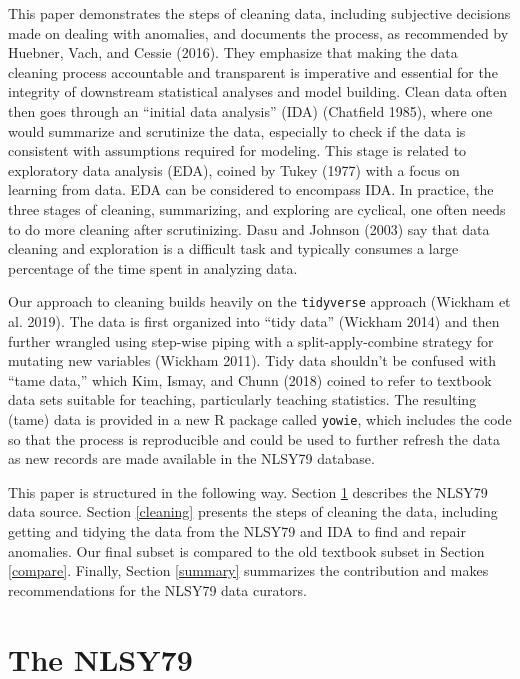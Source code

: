 \documentclass[12pt]{article}
\begin{document}
This paper demonstrates the steps of cleaning data, including subjective decisions made on dealing with anomalies, and documents the process, as recommended by Huebner, Vach, and Cessie (2016). They emphasize that making the data cleaning process accountable and transparent is imperative and essential for the integrity of downstream statistical analyses and model building. Clean data often then goes through an ``initial data analysis'' (IDA) (Chatfield 1985), where one would summarize and scrutinize the data, especially to check if the data is consistent with assumptions required for modeling. This stage is related to exploratory data analysis (EDA), coined by Tukey (1977) with a focus on learning from data. EDA can be considered to encompass IDA. In practice, the three stages of cleaning, summarizing, and exploring are cyclical, one often needs to do more cleaning after scrutinizing. Dasu and Johnson (2003) say that data cleaning and exploration is a difficult task and typically consumes a large percentage of the time spent in analyzing data.

Our approach to cleaning builds heavily on the \texttt{tidyverse} approach (Wickham et al. 2019). The data is first organized into ``tidy data'' (Wickham 2014) and then further wrangled using step-wise piping with a split-apply-combine strategy for mutating new variables (Wickham 2011). Tidy data shouldn't be confused with ``tame data,'' which Kim, Ismay, and Chunn (2018) coined to refer to textbook data sets suitable for teaching, particularly teaching statistics. The resulting (tame) data is provided in a new R package called \texttt{yowie}, which includes the code so that the process is reproducible and could be used to further refresh the data as new records are made available in the NLSY79 database.

This paper is structured in the following way. Section \ref{database} describes the NLSY79 data source. Section \ref{cleaning} presents the steps of cleaning the data, including getting and tidying the data from the NLSY79 and IDA to find and repair anomalies. Our final subset is compared to the old textbook subset in Section \ref{compare}. Finally, Section \ref{summary} summarizes the contribution and makes recommendations for the NLSY79 data curators.

\hypertarget{database}{%
\section{The NLSY79}\label{database}}
\end{document}
